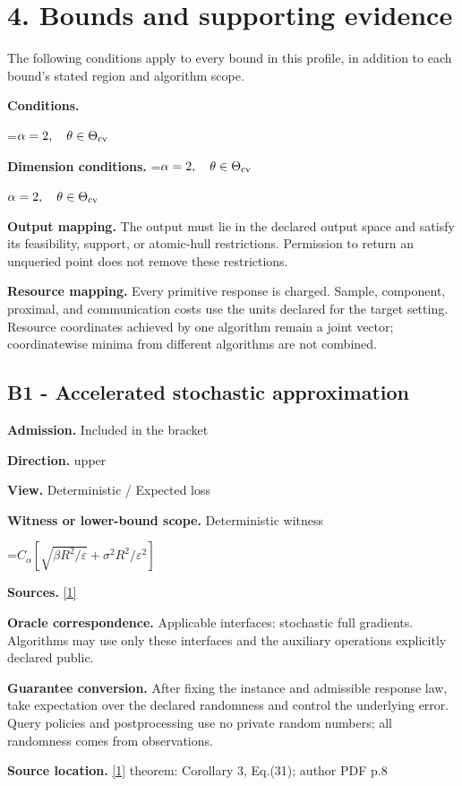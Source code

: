 \documentclass[10pt,a4paper]{article}
\newcommand{\AtlasMath}[1]{\par\begingroup\centering\setbox0=\hbox{$\displaystyle #1$}\ifdim\wd0>1.4\linewidth\typeout{ATLAS WIDE FORMULA: \the\wd0}\fi\ifdim\wd0>\linewidth\resizebox{\linewidth}{!}{\box0}\else\box0\fi\par\endgroup}
\newcommand{\AtlasInlineMath}[1]{\begingroup\setbox0=\hbox{$#1$}\ifdim\wd0>.4\linewidth\endgroup\AtlasMath{#1}\else\endgroup$#1$\fi}
\begin{document}
\section{4. Bounds and supporting evidence}
The following conditions apply to every bound in this profile, in addition to each bound's stated region and algorithm scope.

\textbf{Conditions.} 
\AtlasMath{\alpha=2,\quad\theta\in\Theta_{\rm cv}}


\textbf{Dimension conditions.} \AtlasInlineMath{\alpha=2,\quad\theta\in\Theta_{\rm cv}}

\textbf{Output mapping.} The output must lie in the declared output space and satisfy its feasibility, support, or atomic-hull restrictions. Permission to return an unqueried point does not remove these restrictions.

\textbf{Resource mapping.} Every primitive response is charged. Sample, component, proximal, and communication costs use the units declared for the target setting. Resource coordinates achieved by one algorithm remain a joint vector; coordinatewise minima from different algorithms are not combined.

\subsection{B1 - Accelerated stochastic approximation}
\textbf{Admission.} Included in the bracket

\textbf{Direction.} upper

\textbf{View.} Deterministic / Expected loss

\textbf{Witness or lower-bound scope.} Deterministic witness

\AtlasMath{C_\alpha[\sqrt{\beta R^2/\varepsilon}+\sigma^2R^2/\varepsilon^2]}
\textbf{Sources.} \href{https://optimization-online.org/wp-content/uploads/2008/08/2061.pdf}{[1]}

\textbf{Oracle correspondence.} Applicable interfaces: stochastic full gradients. Algorithms may use only these interfaces and the auxiliary operations explicitly declared public.

\textbf{Guarantee conversion.} After fixing the instance and admissible response law, take expectation over the declared randomness and control the underlying error. Query policies and postprocessing use no private random numbers; all randomness comes from observations.

\textbf{Source location.} \href{https://optimization-online.org/wp-content/uploads/2008/08/2061.pdf}{[1]} theorem: Corollary 3, Eq.(31); author PDF p.8
\end{document}

